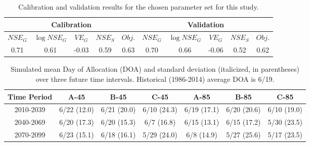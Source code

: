 \documentclass[11pt,letterpaper]{article}
\begin{document}
\begin{table}
\caption{Calibration and validation results for the chosen parameter set for this study.}
\label{table:CalValValues}
\centering
\begin{tabular}{c c c c c | c c c c c}
\hline\hline
\multicolumn{5}{c}{Calibration} & \multicolumn{5}{c}{Validation} \\
\hline
$NSE_G$ & $\log NSE_G$ & $VE_G$ & $NSE_S$ & $Obj.$ & $NSE_G$ & $\log NSE_G$ & $VE_G$ & $NSE_S$ & $Obj.$ \\
\hline
0.71 & 0.61 & -0.03 & 0.59 & 0.63 & 0.70 & 0.66 & -0.06 & 0.52 & 0.62 \\
\hline
\hline
\end{tabular}
\end{table}
\clearpage

\begin{table}
\caption{Simulated mean Day of Allocation (DOA) and standard deviation (italicized, in parentheses) over three future time intervals. Historical (1986-2014) average DOA is 6/19.}
\label{table:SimulatedDOA}
\centering
\begin{tabular}{c c c c c c c}
\hline\hline
Time Period & A-45 & B-45 & C-45 & A-85 & B-85 & C-85 \\
\hline
2010-2039 & 6/22 (12.0) & 6/21 (20.0) & 6/10 (24.3) & 6/19 (17.1) & 6/20 (20.6) & 6/10 (19.0) \\
2040-2069 & 6/20 (17.3) & 6/20 (15.3) & 6/7 (16.8) & 6/15 (13.1) & 6/15 (17.2) & 5/30 (23.5) \\
2070-2099 & 6/23 (15.1) & 6/18 (16.1) & 5/29 (24.0) & 6/8 (14.9) & 5/27 (25.6) & 5/17 (23.5) \\
\hline
\hline
\end{tabular}
\end{table}
\clearpage
\end{document}
